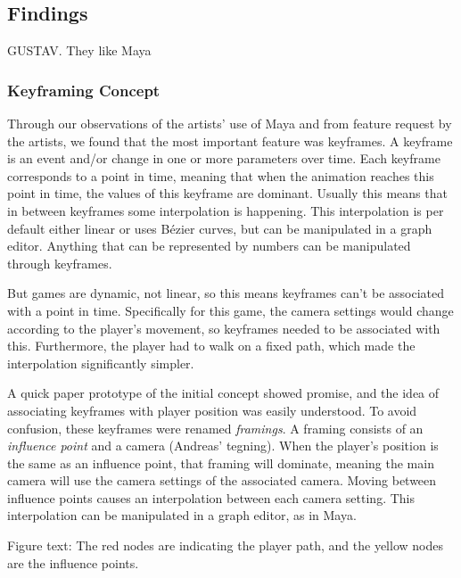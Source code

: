\subsection{Findings}
GUSTAV. They like Maya
\subsubsection{Keyframing Concept}
Through our observations of the artists' use of Maya and from feature request by the artists, we found that the most important feature was keyframes. A keyframe is an event and/or change in one or more parameters over time. Each keyframe corresponds to a point in time, meaning that when the animation reaches this point in time, the values of this keyframe are dominant. Usually this means that in between keyframes some interpolation is happening. This interpolation is per default either linear or uses Bézier curves, but can be manipulated in a graph editor. Anything that can be represented by numbers can be manipulated through keyframes.

But games are dynamic, not linear, so this means keyframes can't be associated with a point in time. Specifically for this game, the camera settings would change according to the player's movement, so keyframes needed to be associated with this. Furthermore, the player had to walk on a fixed path, which made the interpolation significantly simpler.

A quick paper prototype of the initial concept showed promise, and the idea of associating keyframes with player position was easily understood. To avoid confusion, these keyframes were renamed \textit{framings}. A framing consists of an \textit{influence point} and a camera (Andreas' tegning). When the player's position is the same as an influence point, that framing will dominate, meaning the main camera will use the camera settings of the associated camera. Moving between influence points causes an interpolation between each camera setting. This interpolation can be manipulated in a graph editor, as in Maya.

Figure text: The red nodes are indicating the player path, and the yellow nodes are the influence points.